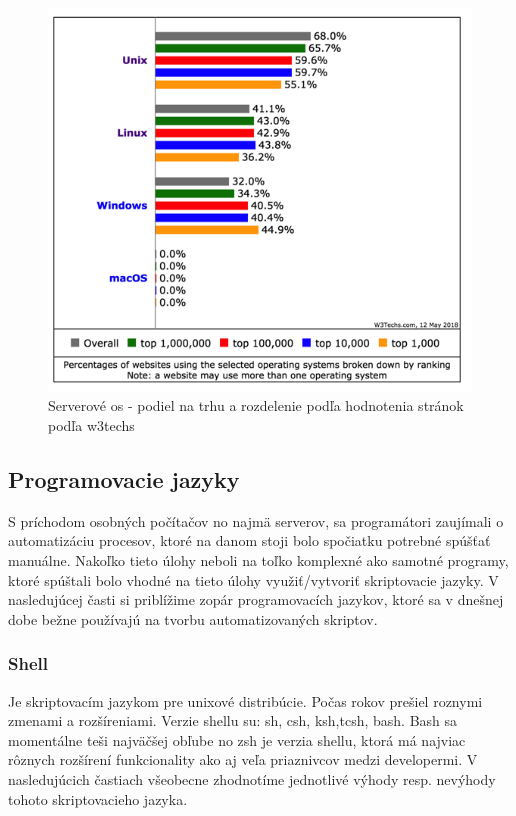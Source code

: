 \begin{figure}[!htbp]
	\centering
	\includegraphics[scale=0.4]{img/usage_grou_by_os_sites.png}
	\caption{Serverové \acrshort{os} - podiel na trhu a rozdelenie podľa hodnotenia stránok podľa w3techs\cite{pop}}
	\label{fig:test}
	
\end{figure}

\subsection{Programovacie jazyky}
\indent S príchodom osobných počítačov no najmä serverov, sa programátori zaujímali o automatizáciu procesov, ktoré na danom stoji bolo spočiatku potrebné spúšťať manuálne. Nakoľko tieto úlohy neboli na toľko komplexné ako samotné programy, ktoré spúštali bolo vhodné na tieto úlohy využiť/vytvoriť skriptovacie jazyky. V nasledujúcej časti si priblížime zopár programovacích jazykov, ktoré sa v dnešnej dobe bežne používajú na tvorbu automatizovaných skriptov.

\subsubsection{Shell}
\indent
Je skriptovacím jazykom pre unixové distribúcie. Počas rokov prešiel roznymi zmenami a rozšíreniami. Verzie shellu su: sh, csh, ksh,tcsh, bash. Bash sa momentálne teši najväčšej obľube no zsh je verzia shellu, ktorá má najviac rôznych rozšírení funkcionality ako aj veľa priaznivcov medzi developermi. V nasledujúcich častiach všeobecne zhodnotíme jednotlivé výhody resp. nevýhody tohoto skriptovacieho jazyka.

